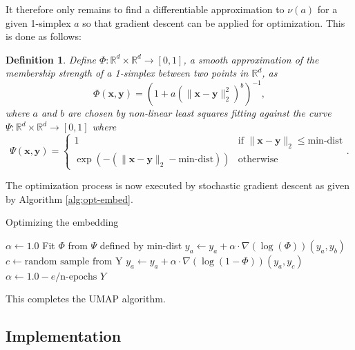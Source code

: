 \documentclass[12pt]{article}
\newtheorem{defn}{Definition}
\begin{document}
It therefore only remains to find a differentiable approximation to $\nu(a)$ for a given 1-simplex $a$ so that gradient descent can be applied for optimization. This is done as follows:

\begin{defn}\label{defn:nu_approx}
Define $\Phi:\mathbb{R}^d \times \mathbb{R}^d \to [0, 1]$, a smooth approximation of the membership strength of a 1-simplex between two points in $\mathbb{R}^d$, as
\[
\Phi(\mathbf{x},\mathbf{y}) = \left(1 + a (\|\mathbf{x} - \mathbf{y} \|_2^2)^{b}\right)^{-1},
\]
where $a$ and $b$ are chosen by non-linear least squares fitting against the curve $\Psi:\mathbb{R}^d \times \mathbb{R}^d \to [0, 1]$ where
\[
\Psi(\mathbf{x},\mathbf{y}) = \begin{cases}
1 & \text{if } \|\mathbf{x} - \mathbf{y}\|_2 \leq \text{min-dist}\\
\exp(-(\|\mathbf{x} - \mathbf{y}\|_2 - \text{min-dist})) & \text{otherwise}
\end{cases}.
\]
\end{defn}

The optimization process is now executed by stochastic gradient descent as given by Algorithm \ref{alg:opt-embed}.

\begin{algorithm}[!hbpt]
\caption{Optimizing the embedding}\label{alg:opt-embed}
\begin{algorithmic}[0]
\setlength\baselineskip{18pt}
    \State $\alpha \gets 1.0$
    \State Fit $\Phi$ from $\Psi$ defined by min-dist
             
                \State $y_a  \gets y_a + \alpha \cdot \nabla (\log(\Phi)) (y_a, y_b)$
                    \State $c \gets \text{random sample from Y}$
                    \State $y_a \gets y_a + \alpha \cdot \nabla (\log(1 - \Phi)) (y_a, y_c)$
                \EndFor
            \EndIf
        \EndFor
        \State
        \State $\alpha \gets 1.0 - e/\text{n-epochs}$
    \EndFor
    \State \Return $Y$
\EndFunction\vskip9pt
\end{algorithmic}
\end{algorithm}

This completes the UMAP algorithm.

\subsection{Implementation}\label{implementation-detail}
\end{document}
